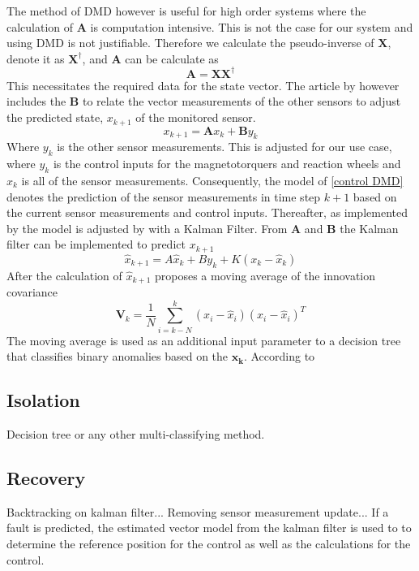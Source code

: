 \documentclass[letterpaper, 10 pt, conference]{ieeeconf}  %
\begin{document}
The method of DMD however is useful for high order systems where the calculation of $\mathbf{A}$ is computation intensive. This is not the case for our system and using DMD is not justifiable. Therefore we calculate the pseudo-inverse of $\mathbf{X}$, denote it as $\mathbf{X^{\dagger}}$, and $\mathbf{A}$ can be calculate as
\begin{equation}
	\mathbf{A} = \mathbf{X}\mathbf{X^{\dagger}}
\end{equation}
This necessitates the required data for the state vector. The article by \textcite{DeSilva2020} however includes the $\mathbf{B}$ to relate the vector measurements of the other sensors to adjust the predicted state, $x_{k+1}$ of the monitored sensor. 
\begin{equation}
	x_{k+1} = \boldsymbol{A}x_k + \boldsymbol{B}y_k
	\label{control DMD}
\end{equation}
Where $y_k$ is the other sensor measurements. This is adjusted for our use case, where $y_k$ is the control inputs for the magnetotorquers and reaction wheels and $x_k$ is all of the sensor measurements. Consequently, the model of \ref{control DMD} denotes the prediction of the sensor measurements in time step $k+1$ based on the current sensor measurements and control inputs.
Thereafter, as implemented by \textcite{DeSilva2020} the model is adjusted by with a Kalman Filter. From $\boldsymbol{A}$ and $\boldsymbol{B}$ the Kalman filter can be implemented to predict $x_{k+1}$
\begin{equation}
	\hat{x}_{k+1} = A\hat{x}_k + By_k + K(x_k - \hat{x}_k)
\end{equation}
After  the calculation of $\hat{x}_{k+1}$ \textcite{DeSilva2020} proposes a moving average of the innovation covariance
\begin{equation}
	\boldsymbol{V}_k = \frac{1}{N} \sum_{i=k-N}^k (x_i - \hat{x}_i)(x_i - \hat{x}_i)^T
\end{equation}
The moving average is used as an additional input parameter to a decision tree that classifies binary anomalies based on the $\boldsymbol{x_k}$. According to

\subsection{Isolation}
Decision tree or any other multi-classifying method.

\subsection{Recovery}
Backtracking on kalman filter... Removing sensor measurement update... If a fault is predicted, the estimated vector model from the kalman filter is used to to determine the reference position for the control as well as the calculations for the control.
\end{document}
